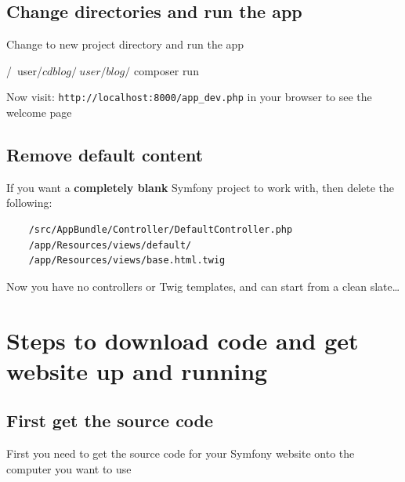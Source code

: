 \documentclass[a4paperpaper,openright]{book}
\newenvironment{Shaded}{}{}
\newcommand{\BuiltInTok}[1]{#1}
\newcommand{\ExtensionTok}[1]{#1}
\newcommand{\NormalTok}[1]{#1}
\begin{document}
\hypertarget{change-directories-and-run-the-app}{%
\section{Change directories and run the
app}\label{change-directories-and-run-the-app}}

Change to new project directory and run the app

\begin{Shaded}
\begin{Highlighting}[]
\NormalTok{    /}\ExtensionTok{~user/}\NormalTok{$ }\BuiltInTok{cd}\NormalTok{ blog}
\NormalTok{    /}\ExtensionTok{~user/blog/}\NormalTok{$ }\ExtensionTok{composer}\NormalTok{ run}
\end{Highlighting}
\end{Shaded}

Now visit: \texttt{http://localhost:8000/app\_dev.php} in your browser
to see the welcome page

\hypertarget{remove-default-content}{%
\section{Remove default content}\label{remove-default-content}}

If you want a \textbf{completely blank} Symfony project to work with,
then delete the following:

\begin{verbatim}
    /src/AppBundle/Controller/DefaultController.php
    /app/Resources/views/default/
    /app/Resources/views/base.html.twig
\end{verbatim}

Now you have no controllers or Twig templates, and can start from a
clean slate\ldots{}

\hypertarget{steps-to-download-code-and-get-website-up-and-running}{%
\chapter{Steps to download code and get website up and
running}\label{steps-to-download-code-and-get-website-up-and-running}}

\hypertarget{first-get-the-source-code}{%
\section{First get the source code}\label{first-get-the-source-code}}

First you need to get the source code for your Symfony website onto the
computer you want to use
\end{document}
